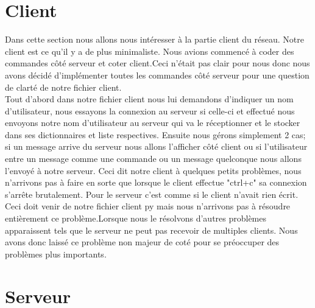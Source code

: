 \documentclass[12pt]{article}
\begin{document}
\section{Client}
Dans cette section nous allons nous intéresser à la partie client du réseau. Notre client est ce qu'il y a de plus minimaliste. Nous avions commencé à coder des commandes côté serveur et coter client.Ceci n'était pas clair pour nous donc nous avons décidé d'implémenter toutes les commandes côté serveur pour une question de clarté de notre fichier client.\\
Tout d'abord dans notre fichier client nous lui demandons d'indiquer un nom d'utilisateur, nous essayons la connexion au serveur si celle-ci et effectué nous envoyons notre nom d'utilisateur au serveur qui va le réceptionner et le stocker dans ses dictionnaires et liste respectives.
Ensuite nous gérons simplement 2 cas; si un message arrive du serveur nous allons l'afficher côté client ou si l'utilisateur entre un message comme une commande ou un message quelconque nous allons l'envoyé à notre serveur. Ceci dit notre client à quelques petits problèmes, nous n'arrivons pas à faire en sorte que lorsque le client effectue "ctrl+c" sa connexion s'arrête brutalement.
Pour le serveur c'est comme si le client n'avait rien écrit. Ceci doit venir de notre fichier client py mais nous n'arrivons pas à résoudre entièrement ce problème.Lorsque nous le résolvons d'autres problèmes apparaissent tels que le serveur ne peut pas recevoir de multiples clients. Nous avons donc laissé ce problème non majeur de coté pour se préoccuper des problèmes plus importants. 

\section{Serveur}
\end{document}
